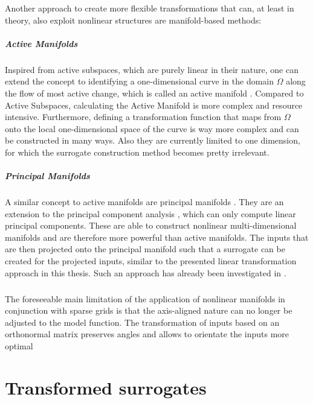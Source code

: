 \documentclass[
  a4paper,  %
  twoside,  %
  bibliography=totoc,
  headsepline,
  cleardoublepage=empty,
  parskip=half,
  draft=false
]{scrbook}
\begin{document}
Another approach to create more flexible transformations that can, at least in theory, also exploit nonlinear structures are manifold-based methods:

\paragraph{Active Manifolds}
Inspired from active subspaces, which are purely linear in their nature, one can extend the concept to identifying a one-dimensional curve in the domain $\Omega$ along the flow of most active change, which is called an active manifold \cite{Bridges2019}.
Compared to Active Subspaces, calculating the Active Manifold is more complex and resource intensive.
Furthermore, defining a transformation function that maps from $\Omega$ onto the local one-dimensional space of the curve is way more complex and can be constructed in many ways.
Also they are currently limited to one dimension, for which the surrogate construction method becomes pretty irrelevant.

\paragraph{Principal Manifolds}
A similar concept to active manifolds are principal manifolds \cite{Huo}.
They are an extension to the principal component analysis \cite{Abdi2010}, which can only compute linear principal components.
These are able to construct nonlinear multi-dimensional manifolds and are therefore more powerful than active manifolds.
The inputs that are then projected onto the principal manifold such that a surrogate can be created for the projected inputs, similar to the presented linear transformation approach in this thesis.
Such an approach has already been investigated in \cite{Feuersaenger2009}.

\paragraph{}
The foreseeable main limitation of the application of nonlinear manifolds in conjunction with sparse grids is that the axis-aligned nature can no longer be adjusted to the model function.
The transformation of inputs based on an orthonormal matrix preserves angles and allows to orientate the inputs more optimal 

\chapter{Transformed surrogates}
\label{chap:c4}
\end{document}
